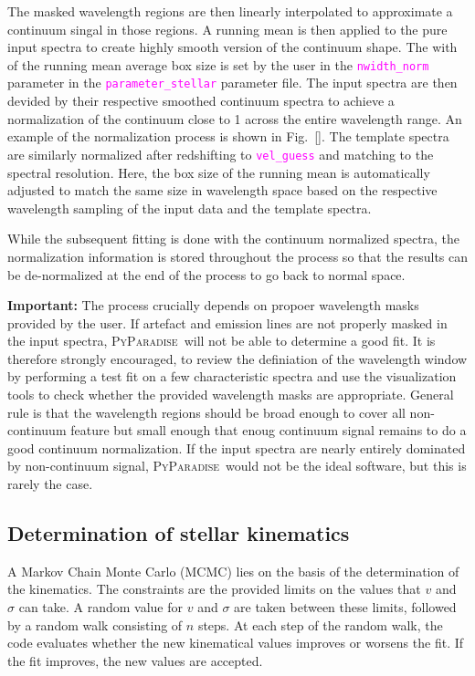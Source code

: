 \documentclass[usenatbib,usegraphicx,useAMS,onecolumn]{mn2e}
\newcommand{\codeline}[1]{\lstinline|#1|}
\newcommand{\fname}[1]{\textcolor{magenta}{\codeline{#1}}}
\newcommand{\PyPar}{\mbox{\textsc{PyParadise}}}
\begin{document}
The masked wavelength regions are then linearly interpolated to approximate a continuum singal in those regions. A running mean is then applied to the pure input spectra to create highly smooth version of the continuum shape. The with of the running mean average box size is set by the user in the \fname{nwidth_norm} parameter in the \fname{parameter_stellar} parameter file. The input spectra are then devided by their respective smoothed continuum spectra to achieve a normalization of the continuum close to 1 across the entire wavelength range. An example of the normalization process is shown in Fig.~\ref{}. The template spectra are similarly normalized after redshifting to \fname{vel_guess} and matching to the spectral resolution. Here, the box size of the running mean is automatically adjusted to match the same size in wavelength space based on the respective wavelength sampling of the input data and the template spectra. 

While the subsequent fitting is done with the continuum normalized spectra, the normalization information is stored throughout the process so that the results can be de-normalized at the end of the process to go back to normal space. 

\begin{tcolorbox}
 \textbf{Important:} The process crucially depends on propoer wavelength masks provided by the user. If artefact and emission lines are not properly masked in the input spectra, \PyPar\ will not be able to determine a good fit. It is therefore strongly encouraged, to review the definiation of the wavelength window by performing a test fit on a few characteristic spectra and use the visualization tools to check whether the provided wavelength masks are appropriate. General rule is that the wavelength regions should be broad enough to cover all non-continuum feature but small enough that enoug continuum signal remains to do a good continuum normalization. If the input spectra are nearly entirely dominated by non-continuum signal, \PyPar\ would not be the ideal software, but this is rarely the case.
\end{tcolorbox}




\subsection{Determination of stellar kinematics}\label{subsec:ssp_kin}
A Markov Chain Monte Carlo (MCMC) lies on the basis of the determination of the kinematics.
The constraints are the provided limits on the values that $v$ and $\sigma$ can take.
A random value for $v$ and $\sigma$ are taken between these limits, followed by a random walk consisting of $n$ steps.
At each step of the random walk, the code evaluates whether the new kinematical values improves or worsens the fit.
If the fit improves, the new values are accepted.
\end{document}
